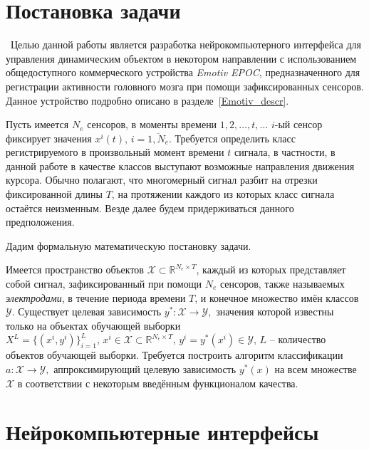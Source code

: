 \documentclass[12pt,a4paper,oneside,fleqn,leqno]{article}
\begin{document}
\clearpage 

\section{Постановка задачи}
	\quad\,\,\,Целью данной работы является разработка нейрокомпьютерного интерфейса для управления динамическим объектом в некотором направлении с использованием общедоступного коммерческого устройства {\it Emotiv EPOC}, предназначенного для регистрации активности головного мозга при помощи зафиксированных сенсоров. Данное устройство подробно описано в разделе~\ref{Emotiv_descr}.
 	\par Пусть имеется $N_e$ сенсоров, в моменты времени $1, 2, \dots, t, \dots$ $i$-ый сенсор фиксирует значения $x^i(t)$, $i = \overline{1,N_e}.$ Требуется определить класс регистрируемого в произвольный момент времени $t$ сигнала, в частности, в данной работе в качестве классов выступают возможные направления движения курсора. Обычно полагают, что многомерный сигнал разбит на отрезки фиксированной длины $T$, на протяжении каждого из которых класс сигнала остаётся неизменным. Везде далее будем придерживаться данного предположения.
	\par Дадим формальную математическую постановку задачи.
	\par Имеется пространство объектов $\mathcal{X} \subset \mathbb{R}^{N_e \times T}$, каждый из которых представляет собой сигнал, зафиксированный при помощи $N_e$ сенсоров, также называемых \textit{электродами}, в течение периода времени $T$, и конечное множество имён классов $\mathcal{Y}$. Существует целевая зависимость $y^*: \mathcal{X} \to \mathcal{Y},$ значения которой известны только на объектах обучающей выборки $X^L = \{ (x^i, y^i)\}_{i=1}^L, \, x^i \in \mathcal{X} \subset \mathbb{R}^{N_e \times T}, \, y^i = y^*(x^i) \in \mathcal{Y}, \, L$ -- количество объектов обучающей выборки. Требуется построить алгоритм классификации $a: \mathcal{X} \to \mathcal{Y},$ аппроксимирующий целевую зависимость $y^*(x)$ на всем множестве $\mathcal{X}$ в соответствии с некоторым введённым функционалом качества.

\clearpage 

\section{Нейрокомпьютерные интерфейсы}
\end{document}

